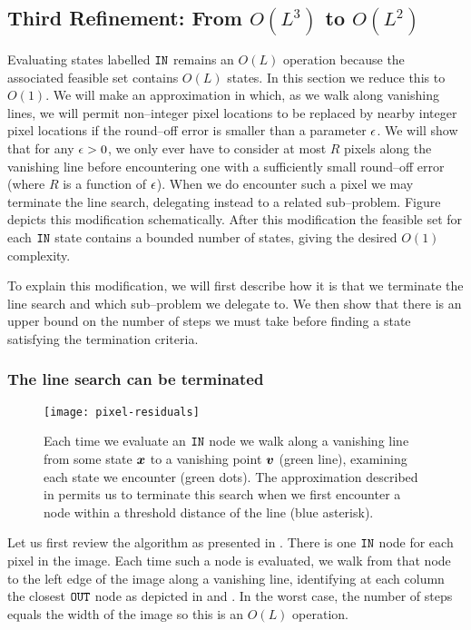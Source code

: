 \subsection{Third Refinement: From $O(L^3)$ to $O(L^2)$}
\label{sec:line-jump}

Evaluating states labelled $\INlabel$ remains an $O(L)$ operation
because the associated feasible set contains $O(L)$ states. In this
section we reduce this to $O(1)$. We will make an approximation in
which, as we walk along vanishing lines, we will permit non--integer
pixel locations to be replaced by nearby integer pixel locations
if the round--off error is smaller than a parameter $\RoundoffEps$. We
will show that for any $\RoundoffEps>0$, we only ever have to consider at
most $R$ pixels along the vanishing line before encountering one with
a sufficiently small round--off error (where $R$ is a function of
$\RoundoffEps$). When we do encounter such a pixel we may terminate the
line search, delegating instead to a related sub--problem. Figure
 depicts this modification
schematically. After this modification the feasible set for each
$\INlabel$ state contains a bounded number of states, giving the
desired $O(1)$ complexity.

To explain this modification, we will first describe how it is that we
terminate the line search and which sub--problem we delegate to. We
then show that there is an upper bound on the number of steps we must
take before finding a state satisfying the termination criteria.

\subsubsection{The line search can be terminated}

\begin{figure}
   \centering
   \texttt{[image: pixel-residuals]}
   \caption{Each time we evaluate an $\INlabel$ node we walk along a
     vanishing line from some state $\vect{x}$ to a vanishing point
     $\vpt$ (green line), examining each state we encounter (green
     dots). The approximation described in  permits
     us to terminate this search when we first encounter a node within
     a threshold distance of the line (blue asterisk).}
   \label{fig:line-jump-schematic}
 \end{figure}

Let us first review the algorithm as presented in
. There is one $\INlabel$ node for each pixel in the
image. Each time such a node is evaluated, we walk from that node to the
left edge of the image along a vanishing line, identifying at each
column the closest $\OUTlabel$ node as depicted in
 and . In the worst
case, the number of steps equals the width of the image so this is an
$O(L)$ operation.

